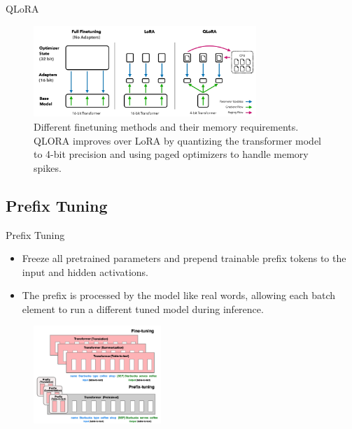 \documentclass[serif, aspectratio=169]{beamer}
\begin{document}
\begin{frame}{QLoRA}
    \begin{figure}
        \centering
        \includegraphics[width=0.75\textwidth]{pic/QLoRA.PNG}
        \caption{Different finetuning methods and their memory requirements. QLORA improves over LoRA by quantizing the transformer model to 4-bit precision and using paged optimizers to handle memory spikes.}
    \end{figure}
\end{frame}

\subsection{Prefix Tuning}
\begin{frame}{Prefix Tuning}
    \begin{itemize}
        \item Freeze all pretrained parameters and prepend trainable prefix tokens to the input and hidden activations.
        \vspace{0.2cm}
        \item The prefix is processed by the model like real words, allowing each batch element to run a different tuned model during inference.
    \end{itemize}
    \begin{figure}
        \centering
        \includegraphics[width=0.43\textwidth]{pic/prefix-tuning.png}
    \end{figure}
\end{frame}
\end{document}

